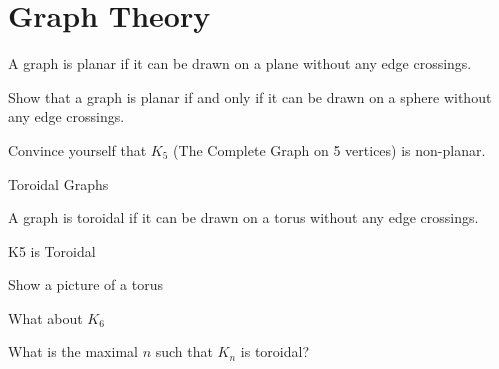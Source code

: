 \section{Graph Theory}
\begin{boxProblem}{}
    \begin{boxDefinition}{}
        A graph is planar if it can be drawn on a plane without any edge crossings.
    \end{boxDefinition}
    Show that a graph is planar if and only if it can be drawn on a sphere without any edge crossings.
\end{boxProblem}
\begin{boxProblem}{}
    Convince yourself that \( K_5 \) (The Complete Graph on 5 vertices) is non-planar.
\end{boxProblem}
\begin{boxProblem}{Toroidal Graphs}
\begin{boxDefinition}{}
    A graph is toroidal if it can be drawn on a torus without any edge crossings.
\end{boxDefinition}
    \begin{boxNote}{}
    \end{boxNote}
    \begin{boxExample}{K5 is Toroidal}
    \begin{boxTODO}{}
        Show a picture of a torus
    \end{boxTODO}
    \end{boxExample}
    \begin{boxProblem}{}
        What about \( K_6 \)
    \end{boxProblem}
    \begin{boxProblem}{}
        What is the maximal \( n \) such that \( K_n \) is toroidal?
    \end{boxProblem}
\end{boxProblem}
